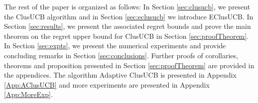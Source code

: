 	
The rest of the paper is organized as follows: In Section \ref{sec:clusucb}, we present the ClusUCB algorithm and in  Section \ref{sec:eclusucb} we introduce EClusUCB. In Section \ref{sec:results}, we present the associated regret bounds and prove the main theorem on the regret upper bound for ClusUCB in Section \ref{sec:proofTheorem}. In Section \ref{sec:expts}, we present the numerical experiments and provide concluding remarks in Section \ref{sec:conclusions}. Further proofs of corollaries, theorems and proposition presented in Section \ref{sec:proofTheorem} are provided in the appendices. The algorithm Adaptive ClusUCB is presented in Appendix \ref{App:AClusUCB} and more experiments are presented in Appendix \ref{App:MoreExp}. 


